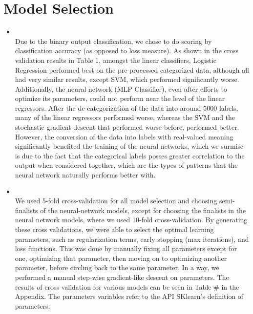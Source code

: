 \section{Model Selection}
\medskip
\begin{itemize}

    \item {} \\
    Due to the binary output classification, we chose to do scoring by classification accuracy (as opposed to loss measure). As shown in the cross validation results in Table 1, amongst the linear classifiers, Logistic Regression performed best on the pre-processed categorized data, although all had very similar results, except SVM, which performed significantly worse. Additionally, the neural network (MLP Classifier), even after efforts to optimize its parameters, could not perform near the level of the linear regressors. After the de-categorization of the data into around 5000 labels, many of the linear regressors performed worse, whereas the SVM and the stochastic gradient descent that performed worse before, performed better. However, the conversion of the data into labels with real-valued meaning significantly benefited the training of the neural networks, which we surmise is due to the fact that the categorical labels posses greater correlation to the output when considered together, which are the types of patterns that the neural network naturally performs better with.

    \item {} \\
    We used 5-fold cross-validation for all model selection and choosing semi-finalists of the neural-network models, except for choosing the finalists in the neural network models, where we used 10-fold cross-validation.  By generating these cross validations, we were able to select the optimal learning parameters, such as regularization terms, early stopping (max iterations), and loss functions. This was done by manually fixing all parameters except for one, optimizing that parameter, then moving on to optimizing another parameter, before circling back to the same parameter. In a way, we performed a manual step-wise gradient-like descent on parameters. The results of cross validation for various models can be seen in Table \# in the Appendix. The parameters variables refer to the API SKlearn's definition of parameters.

\end{itemize}




